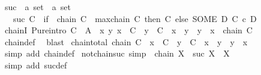 \begin{isabellebody}
\ suc\ {\isacharcolon}{\kern0pt}{\isacharcolon}{\kern0pt}\ {\isachardoublequoteopen}{\isacharprime}{\kern0pt}a\ set\ {\isasymRightarrow}\ {\isacharprime}{\kern0pt}a\ set{\isachardoublequoteclose}\isanewline
\ \ \ {\isachardoublequoteopen}suc\ C\ {\isacharequal}{\kern0pt}\ {\isacharparenleft}{\kern0pt}if\ {\isasymnot}\ chain\ C\ {\isasymor}\ maxchain\ C\ then\ C\ else\ {\isacharparenleft}{\kern0pt}SOME\ D{\isachardot}{\kern0pt}\ C\ {\isacharless}{\kern0pt}c\ D{\isacharparenright}{\kern0pt}{\isacharparenright}{\kern0pt}{\isachardoublequoteclose}\isanewline
\isanewline
{}\isamarkupfalse%
\ chainI\ {\isacharbrackleft}{\kern0pt}Pure{\isachardot}{\kern0pt}intro{\isacharquery}{\kern0pt}{\isacharbrackright}{\kern0pt}{\isacharcolon}{\kern0pt}\ {\isachardoublequoteopen}C\ {\isasymsubseteq}\ A\ {\isasymLongrightarrow}\ {\isacharparenleft}{\kern0pt}{\isasymAnd}x\ y{\isachardot}{\kern0pt}\ x\ {\isasymin}\ C\ {\isasymLongrightarrow}\ y\ {\isasymin}\ C\ {\isasymLongrightarrow}\ x\ {\isasymsqsubseteq}\ y\ {\isasymor}\ y\ {\isasymsqsubseteq}\ x{\isacharparenright}{\kern0pt}\ {\isasymLongrightarrow}\ chain\ C{\isachardoublequoteclose}\isanewline
%
\isadelimproof
\ \ %
\endisadelimproof
%
\isatagproof
{}\isamarkupfalse%
\ chain{\isacharunderscore}{\kern0pt}def\ \isamarkupfalse%
\ blast%
\endisatagproof
{\isafoldproof}%
%
\isadelimproof
\isanewline
%
\endisadelimproof
\isanewline
{}\isamarkupfalse%
\ chain{\isacharunderscore}{\kern0pt}total{\isacharcolon}{\kern0pt}\ {\isachardoublequoteopen}chain\ C\ {\isasymLongrightarrow}\ x\ {\isasymin}\ C\ {\isasymLongrightarrow}\ y\ {\isasymin}\ C\ {\isasymLongrightarrow}\ x\ {\isasymsqsubseteq}\ y\ {\isasymor}\ y\ {\isasymsqsubseteq}\ x{\isachardoublequoteclose}\isanewline
%
\isadelimproof
\ \ %
\endisadelimproof
%
\isatagproof
{}\isamarkupfalse%
\ {\isacharparenleft}{\kern0pt}simp\ add{\isacharcolon}{\kern0pt}\ chain{\isacharunderscore}{\kern0pt}def{\isacharparenright}{\kern0pt}%
\endisatagproof
{\isafoldproof}%
%
\isadelimproof
\isanewline
%
\endisadelimproof
\isanewline
{}\isamarkupfalse%
\ not{\isacharunderscore}{\kern0pt}chain{\isacharunderscore}{\kern0pt}suc\ {\isacharbrackleft}{\kern0pt}simp{\isacharbrackright}{\kern0pt}{\isacharcolon}{\kern0pt}\ {\isachardoublequoteopen}{\isasymnot}\ chain\ X\ {\isasymLongrightarrow}\ suc\ X\ {\isacharequal}{\kern0pt}\ X{\isachardoublequoteclose}\isanewline
%
\isadelimproof
\ \ %
\endisadelimproof
%
\isatagproof
{}\isamarkupfalse%
\ {\isacharparenleft}{\kern0pt}simp\ add{\isacharcolon}{\kern0pt}\ suc{\isacharunderscore}{\kern0pt}def{\isacharparenright}{\kern0pt}%

\end{isabellebody}
